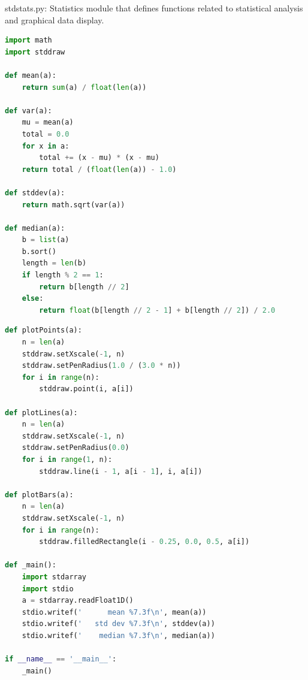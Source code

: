 \documentclass[8pt,a4paper,compress]{beamer}
\begin{document}
\begin{frame}[fragile]
\pause

\begin{framed}
\tiny stdstats.py: Statistics module that defines functions related to statistical analysis and graphical data display.
\end{framed}

\begin{lstlisting}[language=Python]
import math
import stddraw

def mean(a):
    return sum(a) / float(len(a))

def var(a):
    mu = mean(a)
    total = 0.0
    for x in a:
        total += (x - mu) * (x - mu)
    return total / (float(len(a)) - 1.0)

def stddev(a):
    return math.sqrt(var(a))

def median(a):
    b = list(a)
    b.sort()
    length = len(b)
    if length % 2 == 1:
        return b[length // 2]
    else:
        return float(b[length // 2 - 1] + b[length // 2]) / 2.0
\end{lstlisting}
\end{frame}

\begin{frame}[fragile]
\pause

\begin{lstlisting}[language=Python]
def plotPoints(a):
    n = len(a)
    stddraw.setXscale(-1, n)
    stddraw.setPenRadius(1.0 / (3.0 * n))
    for i in range(n):
        stddraw.point(i, a[i])

def plotLines(a):
    n = len(a)
    stddraw.setXscale(-1, n)
    stddraw.setPenRadius(0.0)
    for i in range(1, n):
        stddraw.line(i - 1, a[i - 1], i, a[i])

def plotBars(a):
    n = len(a)
    stddraw.setXscale(-1, n)
    for i in range(n):
        stddraw.filledRectangle(i - 0.25, 0.0, 0.5, a[i])

def _main():
    import stdarray
    import stdio
    a = stdarray.readFloat1D()
    stdio.writef('      mean %7.3f\n', mean(a))
    stdio.writef('   std dev %7.3f\n', stddev(a))
    stdio.writef('    median %7.3f\n', median(a))

if __name__ == '__main__':
    _main()
\end{lstlisting}
\end{frame}
\end{document}
